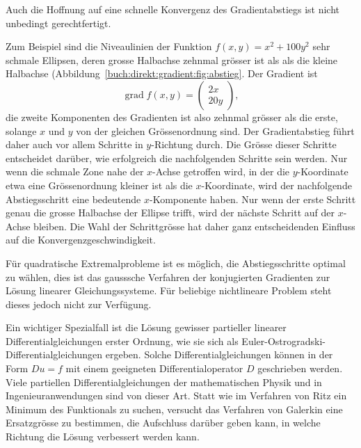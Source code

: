 Auch die Hoffnung auf eine schnelle Konvergenz des Gradientabstiegs ist
nicht unbedingt gerechtfertigt.

Zum Beispiel sind die Niveaulinien der Funktion
\(
f(x,y)
=
x^2+100 y^2
\)
sehr schmale Ellipsen, deren grosse Halbachse zehnmal grösser ist als
als die kleine Halbachse (Abbildung~\ref{buch:direkt:gradient:fig:abstieg}.
Der Gradient ist
\[
\operatorname{grad} f(x,y)
=
\begin{pmatrix}
2x\\
20y
\end{pmatrix},
\]
die zweite Komponenten des Gradienten ist also zehnmal grösser als
die erste, solange $x$ und $y$ von der gleichen Grössenordnung sind.
Der Gradientabstieg führt daher auch vor allem Schritte in $y$-Richtung
durch.
Die Grösse dieser Schritte entscheidet darüber, wie erfolgreich die
nachfolgenden Schritte sein werden.
Nur wenn die schmale Zone nahe der $x$-Achse getroffen wird, in der
die $y$-Koordinate etwa eine Grössenordnung kleiner ist als die
$x$-Koordinate, wird der nachfolgende Abstiegsschritt eine bedeutende
$x$-Komponente haben.
Nur wenn der erste Schritt genau die grosse Halbachse der Ellipse
trifft, wird der nächste Schritt auf der $x$-Achse bleiben.
Die Wahl der Schrittgrösse hat daher ganz entscheidenden Einfluss
auf die Konvergenzgeschwindigkeit.

Für quadratische Extremalprobleme ist es möglich, die Abstiegsschritte
optimal zu wählen, dies ist das gausssche Verfahren der konjugierten
Gradienten zur Lösung linearer Gleichungssysteme.
Für beliebige nichtlineare Problem steht dieses jedoch nicht zur
Verfügung.

Ein wichtiger Spezialfall ist die Lösung gewisser partieller
linearer Differentialgleichungen erster Ordnung, wie sie sich als
Euler-Ostrogradski-Differentialgleichungen ergeben.
Solche Differentialgleichungen können in der Form
$Du=f$ mit einem geeigneten Differentialoperator $D$
geschrieben werden.
Viele partiellen Differentialgleichungen der mathematischen
Physik und in Ingenieuranwendungen sind von dieser Art.
Statt wie im Verfahren von Ritz ein Minimum des Funktionals zu
suchen, versucht das Verfahren von Galerkin eine Ersatzgrösse
zu bestimmen, die Aufschluss darüber geben kann, in welche Richtung
die Lösung verbessert werden kann.

